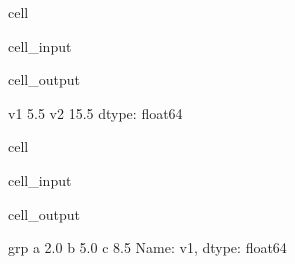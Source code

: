 \documentclass[letterpaper,10pt,english]{jupyterBook}
\begin{document}
\begin{sphinxuseclass}{cell}\begin{sphinxVerbatimInput}

\begin{sphinxuseclass}{cell_input}
\begin{sphinxVerbatim}[commandchars=\\\{\}]
\PYG{p}{[}\PYG{p}{[} \PYG{p}{]}\PYG{p}{]} 
\end{sphinxVerbatim}

\end{sphinxuseclass}\end{sphinxVerbatimInput}
\begin{sphinxVerbatimOutput}

\begin{sphinxuseclass}{cell_output}
\begin{sphinxVerbatim}[commandchars=\\\{\}]
v1     5.5
v2    15.5
dtype: float64
\end{sphinxVerbatim}

\end{sphinxuseclass}\end{sphinxVerbatimOutput}

\end{sphinxuseclass}
\begin{sphinxuseclass}{cell}\begin{sphinxVerbatimInput}

\begin{sphinxuseclass}{cell_input}
\begin{sphinxVerbatim}[commandchars=\\\{\}]
\PYG{p}{[}\PYG{p}{]} 
\end{sphinxVerbatim}

\end{sphinxuseclass}\end{sphinxVerbatimInput}
\begin{sphinxVerbatimOutput}

\begin{sphinxuseclass}{cell_output}
\begin{sphinxVerbatim}[commandchars=\\\{\}]
grp
a    2.0
b    5.0
c    8.5
Name: v1, dtype: float64
\end{sphinxVerbatim}

\end{sphinxuseclass}\end{sphinxVerbatimOutput}

\end{sphinxuseclass}
\end{document}
